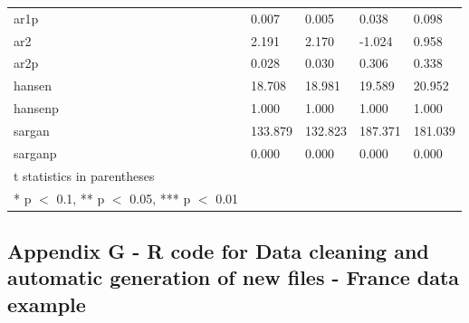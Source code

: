 \documentclass[12pt]{article}
\begin{document}
\begin{tabular}{ p{5.2cm} p{2cm} p{2cm} p{2cm} p{2cm} }
ar1p&0.007&0.005&0.038&0.098\\
ar2&2.191&2.170&-1.024&0.958\\
ar2p&0.028&0.030&0.306&0.338\\
hansen&18.708&18.981&19.589&20.952\\
hansenp&1.000&1.000&1.000&1.000\\
sargan&133.879&132.823&187.371&181.039\\
sarganp&0.000&0.000&0.000&0.000\\
 \hline
 t statistics in parentheses\\
\multicolumn{1}{c}{* p $<$ 0.1, ** p $<$ 0.05, *** p $<$ 0.01} \\
\end{tabular}

\subsection{Appendix G - R code for Data cleaning and automatic generation of new files - France data example}
\hypertarget{G}{}
\end{document}
